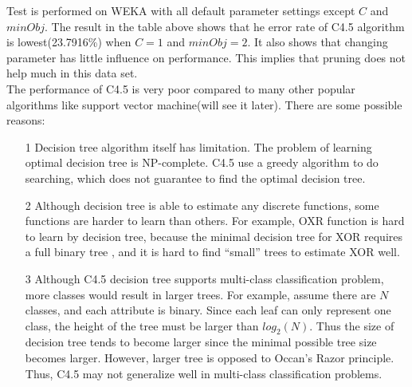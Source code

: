 \documentclass[a4paper,11pt]{nurop}
\begin{document}
Test is performed on WEKA with all default parameter settings except $C$ and $minObj$. The result in the table above shows that he error rate of C4.5 algorithm is lowest(23.7916\%) when $C=1$ and $minObj=2$. It also shows that changing parameter has little influence on performance. This implies that pruning does not help much in this data set.\\
The performance of C4.5 is very poor compared to many other popular algorithms like support vector machine(will see it later). There are some possible reasons:\\
\begin{enumerate}
\item[1] Decision tree algorithm itself has limitation. The problem of learning optimal decision tree is NP-complete\cite{dtnpc}. C4.5 use a greedy algorithm to do searching, which does not guarantee to find the optimal decision tree.
\item[2] Although decision tree is able to estimate any discrete functions, some functions are harder to learn than others. For example, OXR function is hard to learn by decision tree, because the minimal decision tree for XOR requires a full binary tree , and it is hard to find ``small'' trees to estimate XOR well.
\item[3] Although C4.5 decision tree supports multi-class classification problem, more classes would result in larger trees. For example, assume there are $N$ classes, and each attribute is binary. Since each leaf can only represent one class, the height of the tree must be larger than $log_2(N)$. Thus the size of decision tree tends to become larger since the minimal possible tree size becomes larger. However, larger tree is opposed to Occan's Razor principle. Thus, C4.5 may not generalize well in multi-class classification problems.
\end{enumerate}
\end{document}
